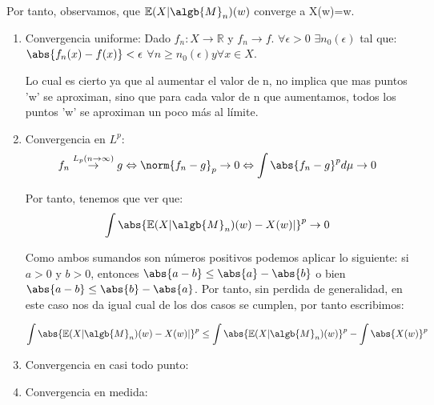 \begin{problem}[1]
Por tanto, observamos, que  $\mathbb{E}(X|\algb{M}_n)(w)$ converge a X(w)=w.

\begin{enumerate}
\item Convergencia uniforme: Dado $f_n:X \rightarrow \mathbb{R}$ y $f_n \rightarrow f$.  $\forall \epsilon >0$ $\exists n_0(\epsilon)$ tal que: $\abs{f_n(x)-f(x)}<\epsilon$ $\forall n\geq n_0(\epsilon) y \forall x \in X.$

Lo cual es cierto ya que al aumentar el valor de n, no implica que mas puntos 'w' se aproximan, sino que para cada valor de n que aumentamos, todos los puntos 'w' se aproximan un poco más al límite.

\item Convergencia en $L^p$:
\[
f_n \stackrel{L_p (n\rightarrow \infty)}{\rightarrow} g \Leftrightarrow \norm{f_n -g}_p  \rightarrow 0 \Leftrightarrow \int{\abs{f_n -g}^pd\mu} \rightarrow 0
\]

Por tanto, tenemos que ver que:
\[
\int \abs{\mathbb{E}(X|\algb{M}_n)(w)-X(w)| }^p \rightarrow 0
\]

Como ambos sumandos son números positivos podemos aplicar lo siguiente: si $a>0$ y $b>0$, entonces $\abs{a-b} \leq \abs{a}- \abs{b}$ o bien $\abs{a-b} \leq \abs{b}- \abs{a}$. Por tanto, sin perdida de generalidad, en este caso nos da igual cual de los dos casos se cumplen, por tanto escribimos:

\[
\int \abs{\mathbb{E}(X|\algb{M}_n)(w)-X(w)| }^p \leq \int \abs{\mathbb{E}(X|\algb{M}_n)(w)}^p- \int \abs{X(w)}^p 
\]

\item Convergencia en casi todo punto:

\item Convergencia en medida:


\end{enumerate}

\end{problem}


